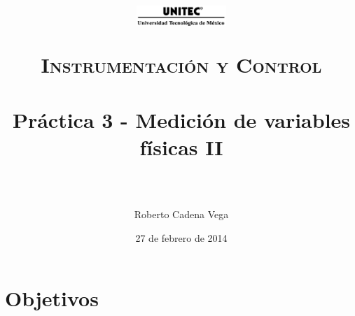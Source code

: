 



\title{	
	\normalfont \normalsize
	\begin{figure}[h]
		\begin{center}
			\includegraphics[width=0.3\textwidth]{../images/UNITEC.png} %
		\end{center}
	\end{figure}
	\textsc{Instrumentación y Control} \\ [25pt]
	\horrule{0.5pt} \\[0.4cm] %
	\huge Práctica 3 - Medición de variables físicas II \\ %
	\horrule{2pt} \\[0.5cm] %
}

\author{Roberto Cadena Vega} %

\date{\normalsize 27 de febrero de 2014} %




\maketitle %


\section{Objetivos}

